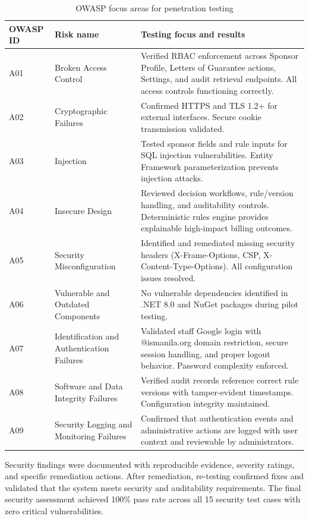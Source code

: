 \begin{table}[h!]
\centering
\caption{OWASP focus areas for penetration testing}
\label{tab:owasp_focus}
\renewcommand{\arraystretch}{1.15}
\setlength{\tabcolsep}{5pt}
\begin{tabularx}{\textwidth}{@{}
  >{\RaggedRight\arraybackslash}p{1.6cm}
  >{\RaggedRight\arraybackslash}p{4.4cm}
  >{\RaggedRight\arraybackslash}X
@{}}
\toprule
\textbf{OWASP ID} & \textbf{Risk name} & \textbf{Testing focus and results} \\
\midrule
A01 & Broken Access Control &
Verified RBAC enforcement across Sponsor Profile, Letters of Guarantee actions, Settings, and audit retrieval endpoints. All access controls functioning correctly. \\
A02 & Cryptographic Failures &
Confirmed HTTPS and TLS 1.2+ for external interfaces. Secure cookie transmission validated. \\
A03 & Injection &
Tested sponsor fields and rule inputs for SQL injection vulnerabilities. Entity Framework parameterization prevents injection attacks. \\
A04 & Insecure Design &
Reviewed decision workflows, rule/version handling, and auditability controls. Deterministic rules engine provides explainable high-impact billing outcomes. \\
A05 & Security Misconfiguration &
Identified and remediated missing security headers (X-Frame-Options, CSP, X-Content-Type-Options). All configuration issues resolved. \\
A06 & Vulnerable and Outdated Components &
No vulnerable dependencies identified in .NET 8.0 and NuGet packages during pilot testing. \\
A07 & Identification and Authentication Failures &
Validated staff Google login with @ismanila.org domain restriction, secure session handling, and proper logout behavior. Password complexity enforced. \\
A08 & Software and Data Integrity Failures &
Verified audit records reference correct rule versions with tamper-evident timestamps. Configuration integrity maintained. \\
A09 & Security Logging and Monitoring Failures &
Confirmed that authentication events and administrative actions are logged with user context and reviewable by administrators. \\
\bottomrule
\end{tabularx}
\end{table}

Security findings were documented with reproducible evidence, severity ratings, and specific remediation actions. After remediation, re-testing confirmed fixes and validated that the system meets security and auditability requirements. The final security assessment achieved 100\% pass rate across all 15 security test cases with zero critical vulnerabilities.
